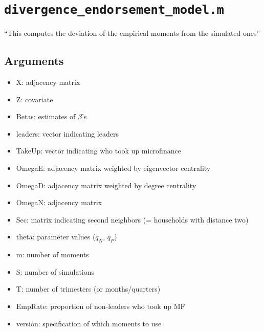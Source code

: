 \documentclass[10pt,letterpaper]{article}
\begin{document}
\section{\texttt{divergence\_endorsement\_model.m}}\label{divergence_endorsement_model}

``This computes the deviation of the empirical moments from the simulated ones''

\subsection*{Arguments}
\begin{itemize}
  \item X: adjacency matrix
  \item Z: covariate
  \item Betas: estimates of $\beta$'s 
  \item leaders: vector indicating leaders
  \item TakeUp: vector indicating who took up microfinance
  \item OmegaE: adjacency matrix weighted by eigenvector centrality
  \item OmegaD: adjacency matrix weighted by degree centrality
  \item OmegaN: adjacency matrix
  \item Sec: matrix indicating second neighbors (= households with distance two)
  \item theta: parameter values ($q_N$, $q_P$)
  \item m: number of moments
  \item S: number of simulations
  \item T: number of trimesters (or months/quarters)
  \item EmpRate: proportion of non-leaders who took up MF
  \item version: specification of which moments to use
\end{itemize}
\end{document}
